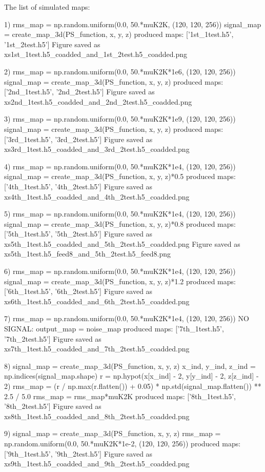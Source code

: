 The list of simulated maps:

1) rms_map = np.random.uniform(0.0, 50.*muK2K, (120, 120, 256))
   signal_map = create_map_3d(PS_function, x, y, z)
   produced maps:  ['1st_1test.h5', '1st_2test.h5']
   Figure saved as xs1st_1test.h5_coadded_and_1st_2test.h5_coadded.png

2) rms_map = np.random.uniform(0.0, 50.*muK2K*1e6, (120, 120, 256))
   signal_map = create_map_3d(PS_function, x, y, z)
   produced maps:  ['2nd_1test.h5', '2nd_2test.h5']
   Figure saved as xs2nd_1test.h5_coadded_and_2nd_2test.h5_coadded.png

3) rms_map = np.random.uniform(0.0, 50.*muK2K*1e9, (120, 120, 256))
   signal_map = create_map_3d(PS_function, x, y, z)
   produced maps:  ['3rd_1test.h5', '3rd_2test.h5']
   Figure saved as xs3rd_1test.h5_coadded_and_3rd_2test.h5_coadded.png

4) rms_map = np.random.uniform(0.0, 50.*muK2K*1e4, (120, 120, 256))
   signal_map = create_map_3d(PS_function, x, y, z)*0.5
   produced maps:  ['4th_1test.h5', '4th_2test.h5']
   Figure saved as xs4th_1test.h5_coadded_and_4th_2test.h5_coadded.png

5) rms_map = np.random.uniform(0.0, 50.*muK2K*1e4, (120, 120, 256))
   signal_map = create_map_3d(PS_function, x, y, z)*0.8
   produced maps:  ['5th_1test.h5', '5th_2test.h5']
   Figure saved as xs5th_1test.h5_coadded_and_5th_2test.h5_coadded.png
   Figure saved as xs5th_1test.h5_feed8_and_5th_2test.h5_feed8.png

6) rms_map = np.random.uniform(0.0, 50.*muK2K*1e4, (120, 120, 256))
   signal_map = create_map_3d(PS_function, x, y, z)*1.2
   produced maps:  ['6th_1test.h5', '6th_2test.h5']
   Figure saved as xs6th_1test.h5_coadded_and_6th_2test.h5_coadded.png

7) rms_map = np.random.uniform(0.0, 50.*muK2K*1e4, (120, 120, 256))
   NO SIGNAL: output_map = noise_map  
   produced maps:  ['7th_1test.h5', '7th_2test.h5']
   Figure saved as xs7th_1test.h5_coadded_and_7th_2test.h5_coadded.png

8) signal_map = create_map_3d(PS_function, x, y, z)
   x_ind, y_ind, z_ind = np.indices(signal_map.shape)
   r = np.hypot(x[x_ind] - 2, y[y_ind] - 2, z[z_ind] - 2)
   rms_map = (r / np.max(r.flatten()) + 0.05) * np.std(signal_map.flatten()) ** 2.5 / 5.0
   rms_map = rms_map*muK2K
   produced maps:  ['8th_1test.h5', '8th_2test.h5']
   Figure saved as xs8th_1test.h5_coadded_and_8th_2test.h5_coadded.png

9) signal_map = create_map_3d(PS_function, x, y, z)
   rms_map = np.random.uniform(0.0, 50.*muK2K*1e-2, (120, 120, 256))
   produced maps:  ['9th_1test.h5', '9th_2test.h5']
   Figure saved as xs9th_1test.h5_coadded_and_9th_2test.h5_coadded.png

